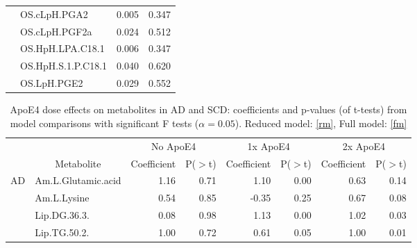 \documentclass{amsart}
\begin{document}
\begin{table}[H]
\begin{tabular}{clll}
& OS.cLpH.PGA2                         & 0.005              & 0.347        \\
& OS.cLpH.PGF2a                        & 0.024              & 0.512        \\
& OS.HpH.LPA.C18.1                     & 0.006              & 0.347        \\
& OS.HpH.S.1.P.C18.1                   & 0.040              & 0.620        \\
& OS.LpH.PGE2                          & 0.029              & 0.552       \\ \bottomrule
\end{tabular}
\end{table}

\begin{table}
\caption{ApoE4 dose effects on metabolites in AD and SCD: coefficients and p-values (of t-tests) from model comparisons with significant F tests ($\alpha=0.05$). Reduced model: \eqref{rm}, Full model: \eqref{fm}}
\centering
\begin{tabular}{clrrrrrr} \toprule
\multicolumn{1}{l}{}  &                                & \multicolumn{2}{c}{No ApoE4}                               & \multicolumn{2}{c}{1x ApoE4}                               & \multicolumn{2}{c}{2x ApoE4}                                \\
\multicolumn{1}{l}{}  & \multicolumn{1}{c}{Metabolite} & \multicolumn{1}{c}{Coefficient} & \multicolumn{1}{c}{P($>$t)} & \multicolumn{1}{c}{Coefficient} & \multicolumn{1}{c}{P($>$t)} & \multicolumn{1}{c}{Coefficient} & \multicolumn{1}{c}{P($>$t)} \\ \midrule
\multirow{14}{0.056\linewidth}{\hspace{0pt}\Centering{}AD} & Am.L.Glutamic.acid & {\cellcolor[rgb]{0.749,0.855,0.675}}1.16 & 0.71 & {\cellcolor[rgb]{0.761,0.863,0.69}}1.10 & 0.00 & {\cellcolor[rgb]{0.863,0.922,0.824}}0.63 & 0.14 \\
 & Am.L.Lysine & {\cellcolor[rgb]{0.882,0.933,0.851}}0.54 & 0.85 & {\cellcolor[rgb]{0.992,0.973,0.973}}-0.35 & 0.25 & {\cellcolor[rgb]{0.855,0.918,0.816}}0.67 & 0.08 \\
 & Lip.DG.36.3. & {\cellcolor[rgb]{0.984,0.992,0.976}}0.08 & 0.98 & {\cellcolor[rgb]{0.757,0.859,0.682}}1.13 & 0.00 & {\cellcolor[rgb]{0.78,0.875,0.714}}1.02 & 0.03 \\
 & Lip.TG.50.2. & {\cellcolor[rgb]{0.784,0.875,0.722}}1.00 & 0.72 & {\cellcolor[rgb]{0.871,0.925,0.831}}0.61 & 0.05 & {\cellcolor[rgb]{0.784,0.878,0.722}}1.00 & 0.01 \\

\end{tabular}
\end{table}
\end{document}
